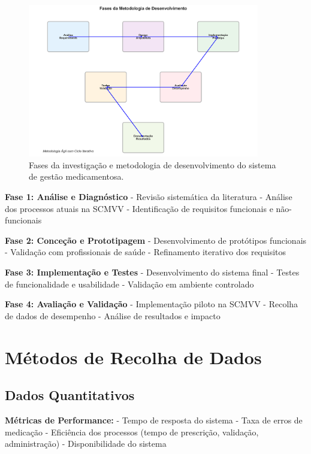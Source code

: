 \begin{figure}[htbp]
    \centering
    \includegraphics[width=0.9\textwidth]{images/generated/methodology_phases.png}
    \caption{Fases da investigação e metodologia de desenvolvimento do sistema de gestão medicamentosa.}
    \label{fig:methodology_phases}
\end{figure}

\textbf{Fase 1: Análise e Diagnóstico}
- Revisão sistemática da literatura
- Análise dos processos atuais na SCMVV
- Identificação de requisitos funcionais e não-funcionais

\textbf{Fase 2: Conceção e Prototipagem}
- Desenvolvimento de protótipos funcionais
- Validação com profissionais de saúde
- Refinamento iterativo dos requisitos

\textbf{Fase 3: Implementação e Testes}
- Desenvolvimento do sistema final
- Testes de funcionalidade e usabilidade
- Validação em ambiente controlado

\textbf{Fase 4: Avaliação e Validação}
- Implementação piloto na SCMVV
- Recolha de dados de desempenho
- Análise de resultados e impacto

\section{Métodos de Recolha de Dados}

\subsection{Dados Quantitativos}

\textbf{Métricas de Performance:}
- Tempo de resposta do sistema
- Taxa de erros de medicação
- Eficiência dos processos (tempo de prescrição, validação, administração)
- Disponibilidade do sistema

